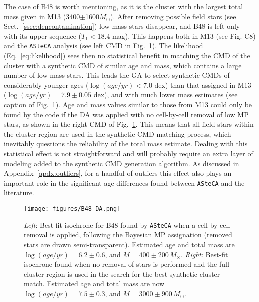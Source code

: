 \documentclass[draft]{aa}
\renewcommand{\includegraphics}[2][]{}
\begin{document}
The case of B48 is worth mentioning, as it is the cluster with the largest total
mass given in M13 (3400$\pm$1600$M_{\odot}$).
After removing possible field stars (see Sect.~\ref{ssec:dencontamination}) low-mass stars disappear, and B48 is left only with its upper sequence 
($T_1<18.4$ mag). This happens both in M13 (see Fig. C8) and the
\texttt{ASteCA} analysis (see left CMD in Fig.~\ref{fig:B48_DA}).
%
The likelihood (Eq.~\ref{eq:likelihood}) sees then no statistical benefit in
matching the CMD of the cluster with a synthetic CMD of similar age and mass,
which contains a large number of low-mass stars.
This leads the GA to select synthetic CMDs of considerably younger ages
($\log(age/yr){<}7.0$ dex) than that assigned in M13
($\log(age/yr){=}7.9\pm0.05$ dex), and with much lower mass estimates (see
caption of Fig.~\ref{fig:B48_DA}).
%
%
Age and mass values similar to those from M13 could  only be found by the code if the DA was applied with no cell-by-cell removal of low MP stars, as shown in
the right CMD of Fig.~\ref{fig:B48_DA}. This means that all field stars within
the cluster region are used in the synthetic CMD matching process, which
inevitably questions the reliability of the total mass estimate.
%
Dealing with this statistical effect is not straightforward and will probably
require an extra layer of modeling added to the synthetic CMD generation
algorithm.
As discussed in Appendix~\ref{apdx:outliers}, for a handful of outliers this
effect also plays an important role in the significant age differences found
between \texttt{ASteCA}
and the literature.

\begin{figure}
\centering
\texttt{[image: figures/B48\_DA.png]}
\caption{\emph{Left}: Best-fit isochrone for B48 found by \texttt{ASteCA} when
a cell-by-cell removal is applied, following the Bayesian MP assignation 
(removed stars are drawn semi-transparent). Estimated age and
total mass are $\log(age/yr){=}6.2{\pm}0.6$, and $M{=}400{\pm}200\,M_{\odot}$.
\emph{Right}: Best-fit isochrone found when no removal of stars is performed
and the full cluster region is used in the search for the best synthetic
cluster match. Estimated age and total mass are now
$\log(age/yr){=}7.5{\pm}0.3$, and $M{=}3000{\pm}900\,M_{\odot}$.}
\label{fig:B48_DA}
\end{figure}
\end{document}
